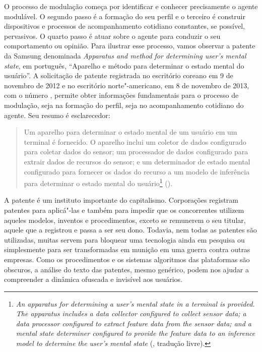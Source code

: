O processo de modulação começa por identificar e conhecer precisamente o
agente modulável. O segundo passo é a formação do seu perfil e o
terceiro é construir dispositivos e processos de acompanhamento
cotidiano constantes, se possível, pervasivos. O quarto passo é atuar
sobre o agente para conduzir o seu comportamento ou opinião. Para
ilustrar esse processo, vamos observar a patente da Samsung denominada
\emph{Apparatus and method for determining user's mental state}, em
português, ``Aparelho e método para determinar o estado mental do
usuário''. A solicitação de patente registrada no escritório coreano em
9 de novembro de 2012 e no escritório norte"-americano, em 8 de novembro
de 2013, com o número , permite obter informações
fundamentais para o processo de modulação, seja na formação do perfil,
seja no acompanhamento cotidiano do agente. Seu resumo é esclarecedor:

\begin{quote}
Um aparelho para determinar o estado mental de um usuário em um terminal
é fornecido. O aparelho inclui um coletor de dados configurado para
coletar dados do sensor; um processador de dados configurado para
extrair dados de recursos do sensor; e um determinador de estado mental
configurado para fornecer os dados do recurso a um modelo de inferência
para determinar o estado mental do usuário\footnote{\emph{An apparatus for
  determining a user's mental state in a terminal is provided. The
  apparatus includes a data collector configured to collect sensor data;
  a data processor configured to extract feature data from the sensor
  data; and a mental state determiner configured to provide the feature
  data to an inference model to determine the user's mental state}
  (, tradução livre).} ().
\end{quote}

A patente é um instituto importante do capitalismo. Corporações
registram patentes para aplicá"-las e também para impedir que os
concorrentes utilizem aqueles modelos, inventos e procedimentos, exceto
se remunerem o seu titular, aquele que a registrou e passa a ser seu
dono. Todavia, nem todas as patentes são utilizadas, muitas servem para
bloquear uma tecnologia ainda em pesquisa ou simplesmente para ser
transformadas em munição em uma guerra contra outras empresas. Como os
procedimentos e os sistemas algoritmos das plataformas são obscuros, a
análise do texto das patentes, mesmo genérico, podem nos ajudar a
compreender a dinâmica ofuscada e invisível aos usuários.

